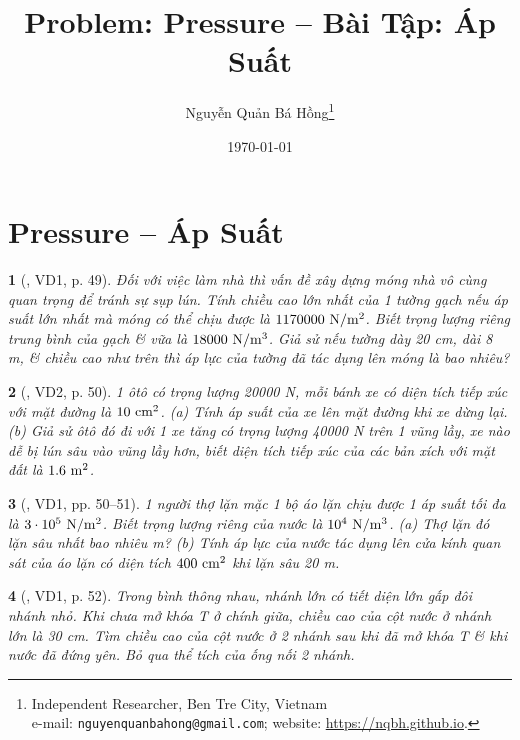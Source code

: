 \documentclass{article}
\title{Problem: Pressure -- Bài Tập: Áp Suất}
\author{Nguyễn Quản Bá Hồng\footnote{Independent Researcher, Ben Tre City, Vietnam\\e-mail: \texttt{nguyenquanbahong@gmail.com}; website: \url{https://nqbh.github.io}.}}
\date{\today}
\newtheorem{baitoan}{}
\begin{document}
\maketitle
\tableofcontents


\section{Pressure -- Áp Suất}

\begin{baitoan}[\cite{Van_Quyen_Hanh_Nhu_10_chuyen_Ly}, VD1, p. 49]
	Đối với việc làm nhà thì vấn đề xây dựng móng nhà vô cùng quan trọng để tránh sự sụp lún. Tính chiều cao lớn nhất của 1 tường gạch nếu áp suất lớn nhất mà móng có thể chịu được là $\rm1170000\ N{\tt/}m^2$. Biết trọng lượng riêng trung bình của gạch \& vữa là $\rm18000\ N{\tt/}m^3$. Giả sử nếu tường dày {\rm20 cm}, dài {\rm8 m}, \& chiều cao như trên thì áp lực của tường đã tác dụng lên móng là bao nhiêu?
\end{baitoan}

\begin{baitoan}[\cite{Van_Quyen_Hanh_Nhu_10_chuyen_Ly}, VD2, p. 50]
	1 ôtô có trọng lượng {\rm20000 N}, mỗi bánh xe có diện tích tiếp xúc với mặt đường là $\rm10\ cm^2$. (a) Tính áp suất của xe lên mặt đường khi xe dừng lại. (b) Giả sử ôtô đó đi với 1 xe tăng có trọng lượng {\rm40000 N} trên 1 vũng lầy, xe nào dễ bị lún sâu vào vũng lầy hơn, biết diện tích tiếp xúc của các bản xích với mặt đất là $\rm1.6\ m^2$.
\end{baitoan}

\begin{baitoan}[\cite{Van_Quyen_Hanh_Nhu_10_chuyen_Ly}, VD1, pp. 50--51]
	1 người thợ lặn mặc 1 bộ áo lặn chịu được 1 áp suất tối đa là $\rm3\cdot10^5\ N{\tt/}m^2$. Biết trọng lượng riêng của nước là $\rm10^4\ N{\tt/}m^3$. (a) Thợ lặn đó lặn sâu nhất bao nhiêu {\rm m}? (b) Tính áp lực của nước tác dụng lên cửa kính quan sát của áo lặn có diện tích $\rm400\ cm^2$ khi lặn sâu {\rm20 m}.
\end{baitoan}

\begin{baitoan}[\cite{Van_Quyen_Hanh_Nhu_10_chuyen_Ly}, VD1, p. 52]
	Trong bình thông nhau, nhánh lớn có tiết diện lớn gấp đôi nhánh nhỏ. Khi chưa mở khóa T ở chính giữa, chiều cao của cột nước ở nhánh lớn là {\rm30 cm}. Tìm chiều cao của cột nước ở 2 nhánh sau khi đã mở khóa T \& khi nước đã đứng yên. Bỏ qua thể tích của ống nối 2 nhánh.
\end{baitoan}
\end{document}
